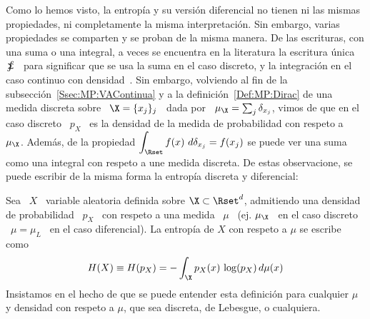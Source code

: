 Como lo hemos  visto, la entrop\'ia y su versi\'on diferencial  no tienen ni las
mismas  propiedades, ni  completamente la  misma interpretaci\'on.  Sin embargo,
varias  propiedades  se  comparten y  se  proban  de  la  misma manera.  De  las
escrituras, con una  suma o una integral, a veces se  encuentra en la literatura
la escritura \'unica \ $\sumint$ \ para significar que se usa la suma en el caso
discreto, y la integraci\'on en el caso continuo con densidad~\cite{Rio07}.  Sin
embargo,   volviendo  al   fin   de  la   subsecci\'on~\ref{Ssec:MP:VAContinua}
y a la  definici\'on~\ref{Def:MP:Dirac} de una medida discreta sobre  \ $\X = \{
x_j \}_j$ \ dada  por \ $\mu_\X = \sum_j \delta_{x_j}$, vimos  de que en el caso
discreto \ $p_X$ \  es la densidad de la medida de  probabilidad con respeto a \
$\mu_\X$.   Adem\'as,   de  la   propiedad  $\displaystyle  \int_\Rset   f(x)  \
d\delta_{x_j} =  f(x_j)$ se puede ver una  suma como una integral  con respeto a
une medida discreta.  De estas observacione, se puede escribir de la misma forma
la entrop\'ia discreta y diferencial:
%
\begin{definicion}
\label{Def:SZ:ShanonMu}
%
Sea \ $X$ \ variable aleatoria definida sobre $\X \subset \Rset^d$, admitiendo
una  densidad de  probabilidad \  $p_X$ \  con respeto  a una  medida \  $\mu$ \
(ej.  $\mu_\X$  \  en   el  caso  discreto  \  $\mu  =  \mu_L$   \  en  el  caso
diferencial). La entrop\'ia de $X$ con respeto a $\mu$ se escribe como
  \[
  H(X) \equiv H(p_X) = - \int_\X p_X(x) \, \log(p_X) \, d\mu(x)
  \]
  Insistamos  en  el hecho  de  que se  puede  entender  esta definici\'on  para
  cualquier $\mu$ y densidad con respeto a $\mu$, que sea discreta, de Lebesgue,
  o cualquiera.
\end{definicion}
